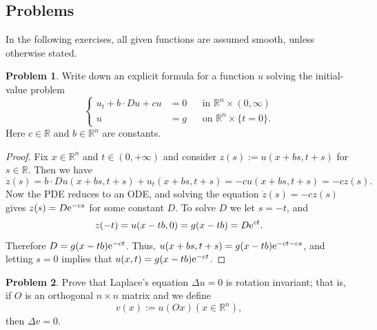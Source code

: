 \documentclass[hyperref,UTF8,12pt]{article}
\numberwithin{equation}{subsection}
\theoremstyle{plain}
\theoremstyle{definition}
\newtheorem{problem}{Problem}
\numberwithin{theorem}{section}
\numberwithin{lemma}{section}
\numberwithin{proposition}{section}
\numberwithin{remark}{section}
\numberwithin{corollary}{section}
\numberwithin{definition}{section}
\numberwithin{problem}{section}
\numberwithin{example}{section}
\def\e{\textup{e}}
\newcommand{\mr}{\mathbb{R}}
\begin{document}
\subsection{Problems}
In the following exercises, all given functions are assumed smooth, unless otherwise stated.
\begin{problem}\label{prob1}
Write down an explicit formula for a function $u$ solving the initial-value problem
\[\left\{\begin{aligned}
	u_t+b\cdot Du+cu & =0 & & \text{in~}\mr^n\times(0,\infty) \\
	u & =g & & \text{on~}\mr^n\times\{t=0\}.
\end{aligned}\right.\]
Here $c\in\mr$ and $b\in\mr^n$ are constants.
\end{problem}
\begin{proof}
Fix $x\in\mr^n$ and $t\in(0,+\infty)$ and consider $z(s):=u(x+bs,t+s)$ for $s\in\mr$. Then we have \[\dot{z}(s)=b\cdot Du(x+bs,t+s)+u_t(x+bs,t+s)=-cu(x+bs,t+s)=-cz(s).\]
Now the PDE reduces to an ODE, and solving the equation $\dot{z}(s)=-cz(s)$ gives $z(s)=D\e^{-cs}$ for some constant $D$. To solve $D$ we let $s=-t$, and \[z(-t)=u(x-tb,0)= g(x-tb)=D\e^{ct}.\]Therefore $D=g(x-tb)\e^{-ct}$. Thus, $u(x+bs,t+s)=g(x-tb)\e^{-ct-cs} $, and letting $s=0$ implies that $u(x,t)=g(x-tb)\e^{-ct}$.
\end{proof}
\begin{problem}\label{prob2}
Prove that Laplace's equation $\Delta u=0$ is rotation invariant; that is, if $O$ is an orthogonal $n\times n$ matrix and we define\[v(x):=u(Ox)(x\in\mr^n),\] then $\Delta v=0$.
\end{problem}
\end{document}
